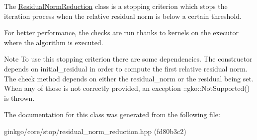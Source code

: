 The \hyperlink{classgko_1_1stop_1_1ResidualNormReduction}{Residual\+Norm\+Reduction} class is a stopping criterion which stops the iteration process when the relative residual norm is below a certain threshold. 

For better performance, the checks are run thanks to kernels on the executor where the algorithm is executed.

\begin{DoxyNote}{Note}
To use this stopping criterion there are some dependencies. The constructor depends on {\ttfamily initial\+\_\+residual} in order to compute the first relative residual norm. The check method depends on either the {\ttfamily residual\+\_\+norm} or the {\ttfamily residual} being set. When any of those is not correctly provided, an exception \+::gko\+::\+Not\+Supported() is thrown. 
\end{DoxyNote}


The documentation for this class was generated from the following file\+:\begin{DoxyCompactItemize}
\item 
ginkgo/core/stop/residual\+\_\+norm\+\_\+reduction.\+hpp (fd80b3c2)\end{DoxyCompactItemize}
